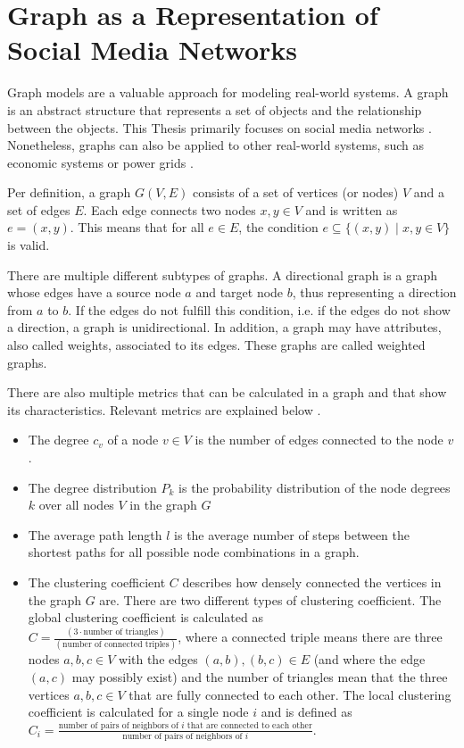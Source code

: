 \section{Graph as a Representation of Social Media Networks}
\label{graphbasics}
Graph models are a valuable approach for modeling real-world systems.
A graph is an abstract structure that represents a set of objects and the 
relationship between the objects. 
This Thesis primarily focuses on social media networks
\cite{socialgraphexample}. Nonetheless, graphs can 
also be applied to other real-world systems, such as economic systems 
\cite{economicsgraph} or power grids \cite{powergraphexample}.


Per definition, a graph $G(V, E)$ consists of a set of vertices (or nodes) $V$ and a 
set of edges $E$. Each edge connects two nodes $x, y \in V$ and is 
written as $e=(x, y)$. This means that for all $e\in E$, the 
condition  $e \subseteq\{ (x, y) \mid x, y \in V  \}$ 
is valid.

There are multiple different subtypes of graphs. A directional graph is a graph 
whose edges have a source node $a$ and target node $b$, thus representing
a direction from $a$ to $b$. If the edges do not fulfill this 
condition, i.e. if the edges do not show a direction, a graph is unidirectional.
In addition, a graph may have attributes, also called weights, 
associated to its edges. These graphs are called weighted graphs.

There are also multiple metrics that can be calculated in a graph
and that show its characteristics. Relevant metrics are 
explained below \cite{basicnetwork}.
\begin{itemize}
    \item The degree $c_v$ of a node $v \in V$ is the number of edges connected to the
    node $v$. 
    \item The degree distribution $P_k$ is the probability distribution 
    of the node degrees $k$ over all nodes $V$ in the graph $G$
    \item The average path length $l$ is the average number of steps between
    the shortest paths for all possible node combinations in a graph.
    \item The clustering coefficient $C$ describes how densely connected
    the vertices in the graph $G$ are. There are two different types of
    clustering coefficient. The global clustering
    coefficient is calculated as \\
    $C=\frac{(3 \cdot\text{number of triangles})}{(\text{number of connected triples})}$,
    where a connected triple means there are three nodes $a,b,c\in V$ with
    the edges $(a,b), (b,c) \in E$ (and where the edge $(a,c)$ may 
    possibly exist) and the number of triangles mean
    that the three vertices $a,b,c\in V$ that are fully connected to each other.
    The local clustering coefficient is calculated for a single node $i$
    and is defined as $C_i=\frac{\text{number of pairs of neighbors of }i 
    \text{ that are connected to each other}}
    {\text{number of pairs of neighbors of }i }$.
\end{itemize}

